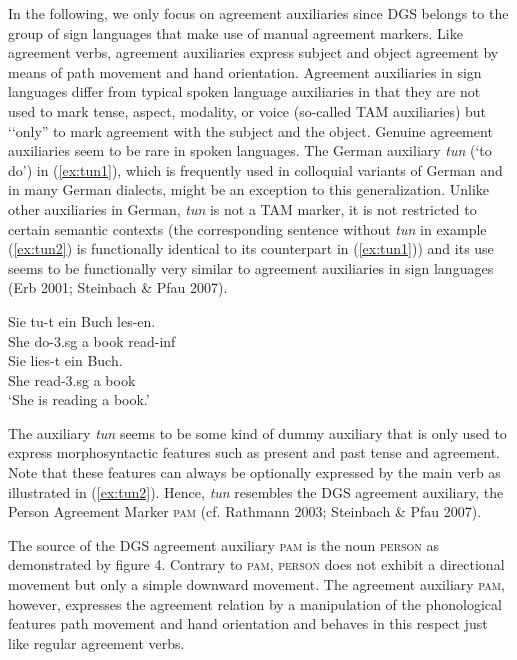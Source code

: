 \documentclass[11pt,a4paper,fleqn]{article}
\begin{document}
In the following, we only focus on agreement auxiliaries since DGS belongs to the group of sign languages that make use of manual agreement markers. Like agreement verbs, agreement auxiliaries express subject and object agreement by means of path movement and hand orientation. Agreement auxiliaries in sign languages differ from typical spoken language auxiliaries in that they are not used to mark tense, aspect, modality, or voice (so-called TAM auxiliaries) but ‘‘only'' to mark agreement with the subject and the object. Genuine agreement auxiliaries seem to be rare in spoken languages. The German auxiliary \textit{tun} (‘to do’) in (\ref{ex:tun1}), which is frequently used in colloquial variants of German and in many German dialects, might be an exception to this generalization. Unlike other auxiliaries in German, \textit{tun} is not a TAM marker, it is not restricted to certain semantic contexts (the corresponding sentence without \textit{tun} in example (\ref{ex:tun2}) is functionally identical to its counterpart in (\ref{ex:tun1})) and its use seems to be functionally very similar to agreement auxiliaries in sign languages (Erb 2001; Steinbach \& Pfau 2007).

\begin{exe}
\ex \label{ex:tun}
\begin{xlist}
\ex	\label{ex:tun1}
	\gll Sie tu-t ein Buch les-en.\\
	She do-3.sg a book read-inf\\
\ex	\label{ex:tun2}
	\gll Sie lies-t ein Buch.\\
	She read-3.sg a book\\
	‘She is reading a book.'
\end{xlist}

\end{exe}

The auxiliary \textit{tun} seems to be some kind of dummy auxiliary that is only used to express morphosyntactic features such as present and past tense and agreement. Note that these features can always be optionally expressed by the main verb as illustrated in (\ref{ex:tun2}). Hence, \textit{tun} resembles the DGS agreement auxiliary, the Person Agreement Marker \textsc{pam} (cf. Rathmann 2003; Steinbach \& Pfau 2007).

The source of the DGS agreement auxiliary \textsc{pam} is the noun \textsc{person} as demonstrated by figure 4. Contrary to \textsc{pam}, \textsc{person} does not exhibit a directional movement but only a simple downward movement.  The agreement auxiliary \textsc{pam}, however, expresses the agreement relation by a manipulation of the phonological features path movement and hand orientation and behaves in this respect just like regular agreement verbs. 
\end{document}
